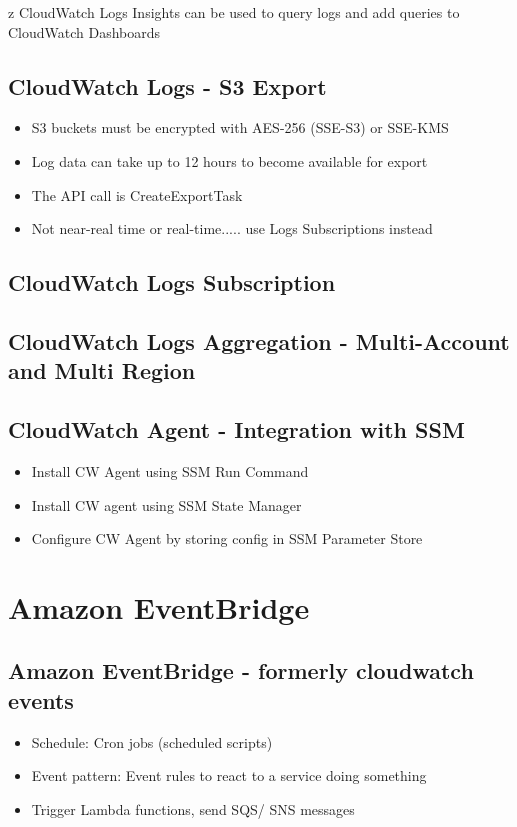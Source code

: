z CloudWatch Logs Insights can be used to query logs and add queries to CloudWatch Dashboards

\subsection{CloudWatch Logs - S3 Export}
\begin{itemize}
    \item S3 buckets must be encrypted with AES-256 (SSE-S3) or SSE-KMS
    \item Log data can take up to 12 hours to become available for export
    \item The API call is CreateExportTask
    \item Not near-real time or real-time..... use Logs Subscriptions instead
\end{itemize}

\subsection{CloudWatch Logs Subscription}

\subsection{CloudWatch Logs Aggregation - Multi-Account and Multi Region}

\subsection{CloudWatch Agent - Integration with SSM}
\begin{itemize}
    \item Install CW Agent using SSM Run Command
    \item Install CW agent using SSM State Manager
    \item Configure CW Agent by storing config in SSM Parameter Store
\end{itemize}


\section{Amazon EventBridge}

\subsection{Amazon EventBridge - formerly cloudwatch events}
\begin{itemize}
    \item Schedule: Cron jobs (scheduled scripts)
    \item Event pattern: Event rules to react to a service doing something
    \item Trigger Lambda functions, send SQS/ SNS messages
\end{itemize}

